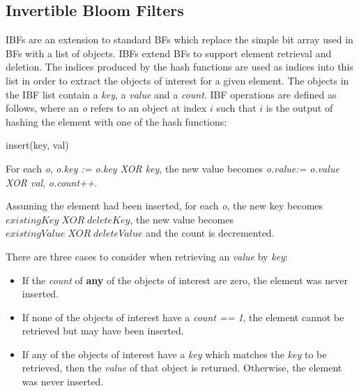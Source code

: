 \begin{appendices}

\chapter{Invertible Bloom Filters}\label{app:IBF}


IBFs are an extension to standard BFs which replace the simple bit array used in BFs with a list of objects. IBFs extend BFs to support element retrieval and deletion. The indices produced by the hash functions are used as indices into this list in order to extract the objects of interest for a given element. The objects in the IBF list contain a \textit{key}, a \textit{value} and a \textit{count}. IBF operations are defined as follows, where an \textit{o} refers to an object at index $i$ such that $i$ is the output of hashing the element with one of the hash functions:

\begin{labeling}{insert(key, val)  }
    \item[\textit{insert(key, val)}] For each \textit{o}, \textit{o.key := o.key XOR key}, the new value becomes \textit{o.value:= o.value XOR val}, \textit{o.count++}. 
    \item[\textit{delete(key)}] Assuming the element had been inserted, for each \textit{o}, the new key becomes $existingKey\;XOR\;deleteKey$, the new value becomes $existingValue\;XOR\;deleteValue$ and the count is decremented.
    \item[\textit{get(key)}] There are three cases to consider when retrieving an \textit{value} by \textit{key}:
    \begin{itemize}
        \item If the \textit{count} of \textbf{any} of the objects of interest are zero, the element was never inserted. 
        \item If none of the objects of interest have a \textit{count == 1}, the element cannot be retrieved but may have been inserted. \item If any of the objects of interest have a \textit{key} which matches the \textit{key} to be retrieved, then the \textit{value} of that object is returned. Otherwise, the element was never inserted.
    \end{itemize}
\end{labeling}

\end{appendices}